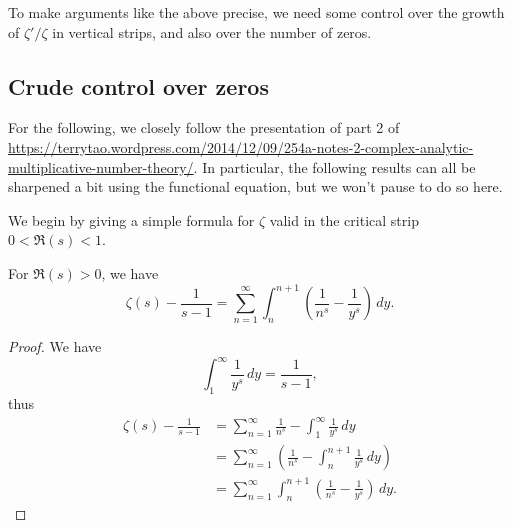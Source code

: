 \documentclass[reqno]{amsart}  \numberwithin{theorem}{section} \numberwithin{equation}{section}
\begin{document}
To make arguments like the above precise, we need some control over the growth of $ \zeta ' / \zeta $ in vertical strips, and also over the number of zeros.

\subsection{Crude control over zeros}\label{sec:cj410a1fzy}
For the following, we closely follow the presentation of part 2 of \href{these notes}{https://terrytao.wordpress.com/2014/12/09/254a-notes-2-complex-analytic-multiplicative-number-theory/}.  In particular, the following results can all be sharpened a bit using the functional equation, but we won't pause to do so here.

We begin by giving a simple formula for $\zeta$ valid in the critical strip $0 < \Re(s) < 1$.
\begin{lemma}
  For $\Re(s) > 0$, we have
  \begin{equation}\label{eq:cj41j93u44}
    \zeta(s) - \frac{1}{s - 1}
    = \sum_{n = 1}^\infty \int_n^{n+1}  \left( \frac{1}{n^s }  - \frac{1}{y^s} \right)   \, d y.
\end{equation}
  
\end{lemma}
\begin{proof}
  We have
  \begin{equation*}
    \int_1^\infty \frac{1}{y^s } \, d y = \frac{1}{s - 1},
  \end{equation*}
  thus
  \begin{align*}
    \zeta(s) - \frac{1}{s - 1}
    &=
      \sum_{n = 1}^\infty \frac{1}{n^s } - \int_1^\infty \frac{1}{y^s } \, d y \\
    &=
    \sum_{n = 1}^\infty \left( \frac{1}{n^s } - \int_n^{n+1} \frac{1}{y^s} \, d y \right) \\
 &=
    \sum_{n = 1}^\infty \int_n^{n+1}  \left( \frac{1}{n^s }  - \frac{1}{y^s} \right)   \, d y.
  \end{align*}
\end{proof}
\end{document}
